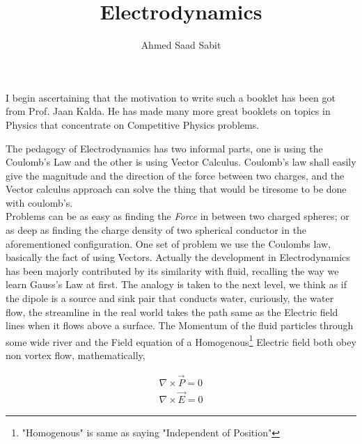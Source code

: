 \documentclass[11pt,a4paper,landscape,twocolumn]{article}
\author{Ahmed Saad Sabit}
\title{Electrodynamics}
\theoremstyle{definition}
\theoremstyle{definition}
\theoremstyle{definition}
\theoremstyle{definition}
\begin{document}
\maketitle

I begin ascertaining that the motivation to write such a booklet has been got from Prof. Jaan Kalda. He has made many more great booklets on topics in Physics that concentrate on Competitive Physics problems.

The pedagogy of Electrodynamics has two informal parts, one is using the Coulomb's Law and the other is using Vector Calculus. Coulomb's law shall easily give the magnitude and the direction of the force between two charges, and the Vector calculus approach can solve the thing that would be tiresome to be done with coulomb's. \\
%
Problems can be as easy as finding the \emph{Force} in between two charged spheres; or as deep as finding the charge density of two spherical conductor in the aforementioned configuration. One set of problem we use the Coulombs law, basically the fact of using Vectors. 
 Actually the development in Electrodynamics has been majorly contributed by its similarity with fluid, recalling the way we learn Gauss's Law at first.
%
The analogy is taken to the next level, we think as if the dipole is a source and sink pair that conducts water, curiously, the water flow, the streamline in the real world takes the path same as the Electric field lines when it flows above a surface.
%
The Momentum of the fluid particles through some wide river and the Field equation of a Homogenous\footnote{"Homogenous" is same as saying "Independent of Position"} Electric field both obey non vortex flow, mathematically,

\begin{align*}
\nabla \times \vec{P} = 0 \\
\nabla \times \vec{E} = 0 
\end{align*}
\end{document}
